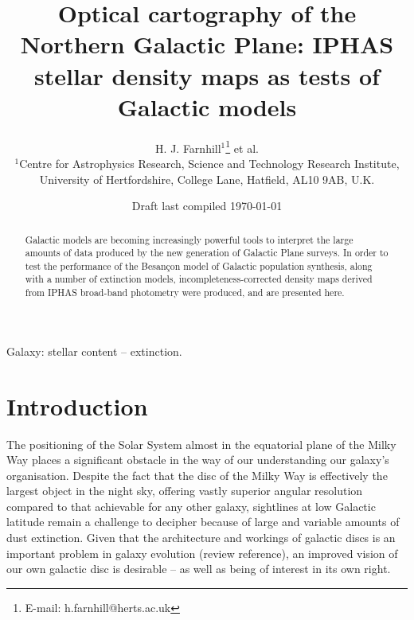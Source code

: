 \documentclass[a4paper,useAMS,usenatbib]{mn2e}
\title[Optical cartography of the Northern Galactic Plane]{Optical cartography 
of the Northern Galactic Plane: IPHAS stellar density maps as tests of Galactic models}
\author[H. J. Farnhill et al.]{H. J. Farnhill$^{1}$\thanks{E-mail:
h.farnhill@herts.ac.uk} et al.
\\
$^{1}$Centre for Astrophysics Research, Science and Technology Research Institute, University of Hertfordshire, College Lane, Hatfield, AL10 9AB, U.K.}
\begin{document}
\date{Draft last compiled \today}

\pagerange{\pageref{firstpage}--\pageref{lastpage}} 

\maketitle

\label{firstpage}

\begin{abstract}
Galactic models are becoming increasingly powerful tools to interpret the 
large amounts of data produced by the new generation of Galactic Plane 
surveys. In order to test the performance of the Besan\c{c}on model of 
Galactic population synthesis, along with a number of extinction models, 
incompleteness-corrected density maps derived from IPHAS broad-band photometry 
were produced, and are presented here.
\end{abstract}

\begin{keywords}
Galaxy: stellar content -- extinction.
\end{keywords}

\section{Introduction}

The positioning of the Solar System almost in the equatorial plane of the Milky
Way places a significant obstacle in the way of our understanding our galaxy's  
organisation. Despite the fact that the disc of the Milky Way is effectively 
the largest object in the night sky, offering vastly superior angular resolution 
compared to that achievable for any other galaxy, sightlines at low Galactic latitude 
remain a challenge to decipher because of large and variable amounts of dust 
extinction.  Given that the architecture and workings of galactic 
discs is an important problem in galaxy evolution (review reference), an improved 
vision of our own galactic disc is desirable -- as well as being of interest in its 
own right.
\end{document}
